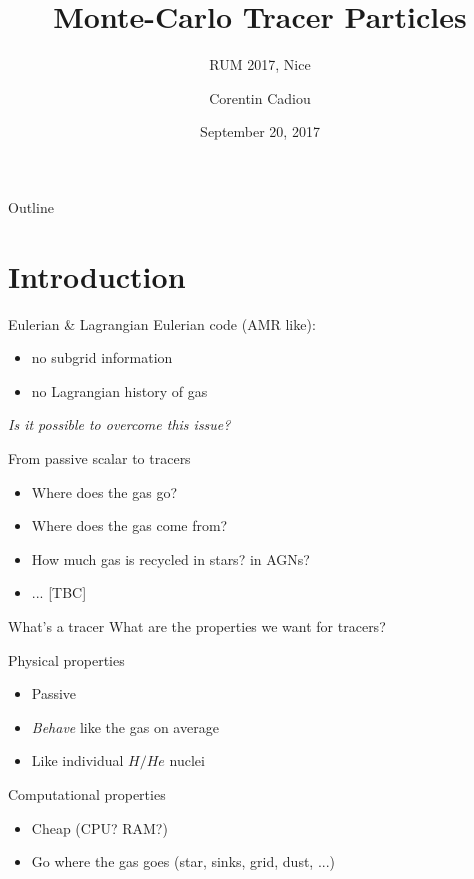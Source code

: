 \documentclass{beamer}
\title{Monte-Carlo Tracer Particles}
\subtitle{RUM 2017, Nice}
\author{Corentin Cadiou}
\institute{IAP, CNRS}
\date{September 20, 2017}
\begin{document}
\frame[plain]{\titlepage}

\begin{frame}[plain]{Outline}
  \tableofcontents
\end{frame}

\section{Introduction}

\begin{frame}{Eulerian \& Lagrangian}
  Eulerian code (AMR like):
  \begin{itemize}
  \item no subgrid information
  \item no Lagrangian history of gas
  \end{itemize}

  {\em Is it possible to overcome this issue?}
\end{frame}
\begin{frame}{From passive scalar to tracers}

  \begin{itemize}
  \item<1-> Where does the gas go?
  \item<2-> Where does the gas come from?
  \item<3-> How much gas is recycled in stars? in AGNs?
  \item<4-> ... [TBC]
  \end{itemize}

\end{frame}

\begin{frame}{What's a tracer}
  What are the properties we want for tracers?
  \pause
  \begin{block}{Physical properties}
    \begin{itemize}
    \item Passive
    \item {\em Behave} like the gas on average
    \item Like individual $H/He$ nuclei
    \end{itemize}
  \end{block}

  \begin{block}{Computational properties}
    \begin{itemize}
    \item Cheap (CPU? RAM?)
    \item Go where the gas goes (star, sinks, grid, dust, ...)
    \end{itemize}
  \end{block}

\end{frame}
\end{document}
